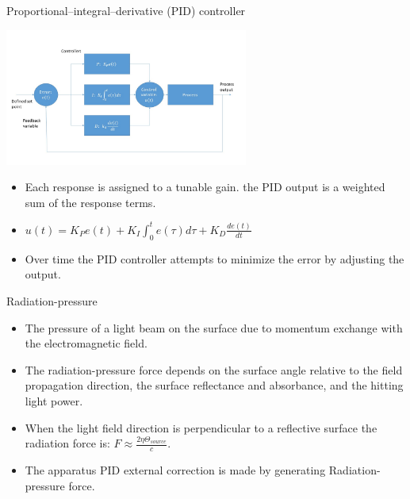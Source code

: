 \documentclass{beamer}
\begin{document}
\begin{frame}{Proportional–integral–derivative (PID) controller}
	\begin{center}		
		\includegraphics[width=0.6\textwidth,keepaspectratio]{pid_diagram_powerpoint.jpg}
    \end{center}
	\begin{itemize}	
		\item Each response is assigned to a tunable gain. the PID output is a weighted sum of the response terms.
		\item $u(t) = K_P e(t)+K_I\int_{0}^{t}e(\tau)d\tau+K_D\frac{de(t)}{dt}$
		\pause
		\item Over time the PID controller attempts to minimize the error by adjusting the output.
	\end{itemize}
\end{frame}
\begin{frame}{Radiation-pressure}
	\begin{itemize}
		
		\item The pressure of a light beam on the surface due to momentum exchange with the electromagnetic field.
		\pause
		\item The radiation-pressure force depends on the surface angle relative to the field propagation direction, the surface reflectance and absorbance, and the hitting light power.
		\pause
		\item When the light field direction is perpendicular to a reflective surface the radiation force is: $F  \approx\frac{2\eta\Theta_{source}}{{c}} $.
		\pause
		\item The apparatus PID external correction is made by generating Radiation-pressure force.
	\end{itemize}
\end{frame}
\end{document}
